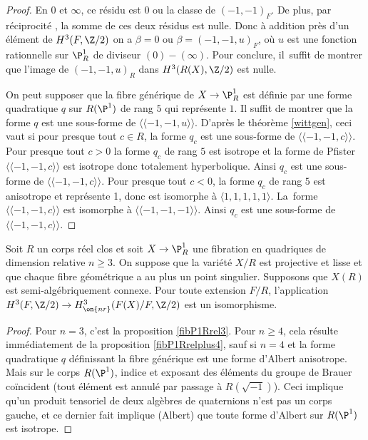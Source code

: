 \begin{proof}
En $0$ et $\infty$, ce résidu est $0$ ou la classe de $(-1,-1)_{F}$.
De plus, par réciprocité \cite[Prop.\,2.2]{rost1996chow}, la somme de ces deux résidus est nulle. Donc
à addition près d'un élément de $H^3(F,\Z/2)$ on a
$\beta=0$ ou $\beta=(-1,-1,u)_{F}$, où $u$ est une fonction rationnelle sur $\P^1_{R}$
de diviseur $(0)-(\infty)$. Pour conclure, il~suffit de montrer que l'image de $(-1,-1,u)_{R}$ dans $H^3(R(X), \Z/2)$ est nulle.

On peut supposer que la fibre générique de $X\to \P^1_R$ est définie par une forme quadratique $q$ sur $R(\P^1)$ de rang $5$ qui représente $1$.
Il suffit de montrer que la forme $q$ est une sous-forme de $\langle \!\langle -1,-1,u\rangle \!\rangle$.
D'après le théorème \ref{wittgen}, ceci vaut si pour presque tout $c\in R$,
la forme $q_{c}$ est une sous-forme de $\langle \!\langle -1,-1,c\rangle \!\rangle$.
Pour presque tout $c>0$ la forme $q_{c}$ de rang $5$ est isotrope et la forme de Pfister $\langle \!\langle-1,-1,c\rangle \!\rangle$ est isotrope donc
totalement hyperbolique. Ainsi $q_{c}$ est une sous-forme de $\langle \!\langle-1,-1,c\rangle \!\rangle$.
Pour presque tout $c<0$, la forme $q_{c}$ de rang $5$ est anisotrope et représente 1, donc
est isomorphe à $ \langle 1,1,1,1,1\rangle $. La~forme $\langle \!\langle-1,-1,c\rangle \!\rangle$ est isomorphe
à $\langle \!\langle-1,-1,-1\rangle \!\rangle$. Ainsi $q_{c}$ est une sous-forme de $\langle \!\langle-1,-1,c\rangle \!\rangle$.
\end{proof}

\begin{prop}\label{fibquaRconnexenqeq3}
Soit $R$ un corps réel clos et soit $X\to \P^1_{R}$ une fibration en quadriques de dimension relative $ n \geq 3$.
On suppose que la variété $X/R$ est projective et lisse
et que chaque fibre géométrique a au plus un point singulier.
Supposons que $X(R)$ est semi-algébriquement connexe.
Pour toute extension $F/R$, l'application $H^3(F,\Z/2) \to H^3_{\on{nr}}(F(X)/F, \Z/2)$ est
un isomorphisme.
\end{prop}
\begin{proof}
Pour $n=3$, c'est la proposition \ref{fibP1Rrel3}. Pour $n\geq 4$,
cela résulte immédiatement de la proposition \ref{fibP1Rrelplus4}, sauf si
$n=4$ et la forme quadratique $q$ définissant la fibre générique
est une forme d'Albert anisotrope. Mais sur le corps $R(\P^1)$,
indice et exposant des éléments du groupe de Brauer coïncident
(tout élément est annulé par passage à $R(\sqrt{-1})$). Ceci implique
qu'un produit tensoriel de deux algèbres de quaternions n'est pas un corps
gauche, et ce dernier fait implique (Albert) que toute forme d'Albert sur $R(\P^1)$ est isotrope.
\end{proof}

